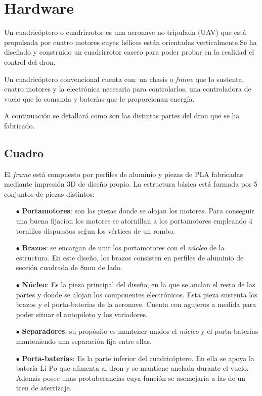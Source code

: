 \chapter{Hardware}
Un cuadricóptero o cuadrirrotor es una aeronave no tripulada (UAV) que está propulsada por cuatro motores cuyas hélices están orientadas verticalmente.Se ha diseñado y construido un cuadrirrotor casero para poder probar en la realidad el control del dron. 

Un cuadricóptero convencional cuenta con: un chasis o \textit{frame} que lo sustenta, cuatro motores y la electrónica necesaria para controlarlos, una controladora de vuelo que lo comanda y baterías que le proporcionan energía.

A continuación se detallará como son las distintas partes del dron que se ha fabricado.

\section{Cuadro}
El \textit{frame} está compuesto por perfiles de aluminio y piezas de PLA fabricadas mediante impresión 3D de diseño propio. La estructura básica está formada por 5 conjuntos de piezas distintos:
\begin{itemize}
	\item[$\bullet$] \textbf{Portamotores}: son las piezas donde se alojan los motores. Para conseguir una buena fijacion los motores se atornillan a los portamotores empleando 4 tornillos dispuestos seǵun los vértices de un rombo.
	
	
	\item [$\bullet$] \textbf{Brazos}: se encargan de unir los portamotores con el \textit{núcleo} de la estructura. En este diseño, los brazos consisten en perfiles de aluminio de sección cuadrada de 8mm de lado.
	
	\item [$\bullet$] \textbf{Núcleo}: Es la pieza principal del diseño, en la que se anclan el resto de las partes y donde se alojan los componentes electrónicos. Esta pieza sustenta los brazos y el porta-baterias de la aeronave. Cuenta con agujeros a medida para poder situar el autopiloto y los variadores.
	
	 
	\item [$\bullet$] \textbf{Separadores}: su propósito es mantener unidos el \textit{núcleo} y el porta-baterías manteniendo una separación fija entre ellas.
	
	
	\item [$\bullet$] \textbf{Porta-baterías}: Es la parte inferior del cuadricóptero. En ella se apoya la batería Li-Po que alimenta al dron y se mantiene anclada durante el vuelo. Además posee unas protuberancias cuya función se asemejaría a las de un tren de aterrizaje.  
	
	
	  
\end{itemize} 

